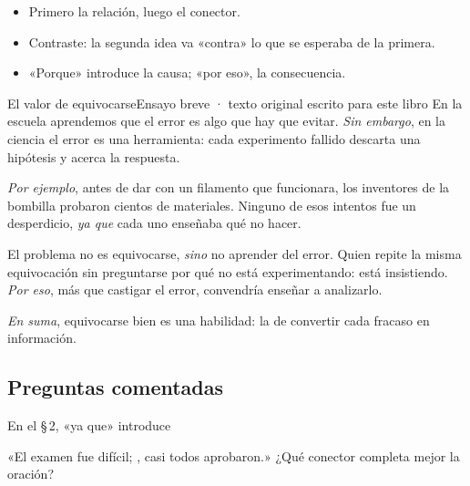 
\begin{regla}
\begin{itemize}
  \item Primero la relación, luego el conector.
  \item Contraste: la segunda idea va «contra» lo que se esperaba de la primera.
  \item «Porque» introduce la causa; «por eso», la consecuencia.
\end{itemize}
\end{regla}

\begin{texto}{El valor de equivocarse}{Ensayo breve · texto original escrito para este libro}
\pa En la escuela aprendemos que el error es algo que hay que evitar. \emph{Sin embargo}, en la ciencia el error es una
herramienta: cada experimento fallido descarta una hipótesis y acerca la respuesta.

\pa \emph{Por ejemplo}, antes de dar con un filamento que funcionara, los inventores de la bombilla probaron cientos de
materiales. Ninguno de esos intentos fue un desperdicio, \emph{ya que} cada uno enseñaba qué no hacer.

\pa El problema no es equivocarse, \emph{sino} no aprender del error. Quien repite la misma equivocación sin preguntarse por
qué no está experimentando: está insistiendo. \emph{Por eso}, más que castigar el error, convendría enseñar a analizarlo.

\pa \emph{En suma}, equivocarse bien es una habilidad: la de convertir cada fracaso en información.
\end{texto}

\subsection{Preguntas comentadas}
\begin{comentada}{En el \S\,2, «ya que» introduce}
\end{comentada}

\begin{reto}
«El examen fue difícil; \underline{\hspace{18mm}}, casi todos aprobaron.» ¿Qué conector completa mejor la oración?
\end{reto}

